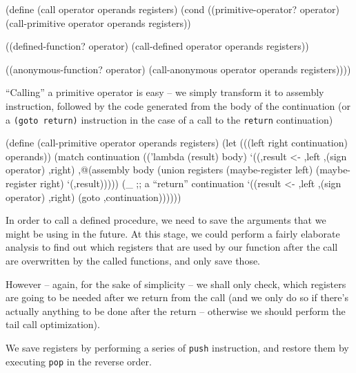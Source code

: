 \begin{Snippet}
    (define (call operator operands registers)
      (cond ((primitive-operator? operator)
             (call-primitive operator operands registers))

            ((defined-function? operator)
             (call-defined operator operands registers))

            ((anonymous-function? operator)
             (call-anonymous operator operands registers))))
\end{Snippet}

``Calling'' a primitive operator is easy -- we simply transform
it to assembly instruction, followed by the code generated from
the body of the continuation (or a \texttt{(goto return)}
instruction in the case of a call to the \texttt{return}
continuation)

\begin{Snippet}
    (define (call-primitive operator operands registers)
      (let (((left right continuation) operands))
        (match continuation
          (('lambda (result) body)
           `((,result <- ,left ,(sign operator) ,right)
             ,@(assembly body (union registers
                                     (maybe-register left)
                                     (maybe-register right)
                                     `(,result)))))
          (_ ;; a ``return'' continuation
           `((result <- ,left ,(sign operator) ,right)
             (goto ,continuation))))))
\end{Snippet}

In order to call a defined procedure, we need to save the
arguments that we might be using in the future. At this stage,
we could perform a fairly elaborate analysis to find out
which registers that are used by our function after the call
are overwritten by the called functions, and only save those.

However -- again, for the sake of simplicity -- we shall only
check, which registers are going to be needed after we return
from the call (and we only do so if there's actually anything
to be done after the return -- otherwise we should perform the
tail call optimization).

We save registers by performing a series of \texttt{push}
instruction, and restore them by executing \texttt{pop}
in the reverse order. 

